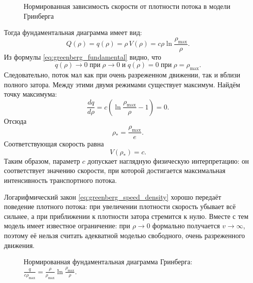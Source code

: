 \documentclass[12pt,a4paper]{article}
\begin{document}
\begin{figure}[ht]
\centering
{}
\caption{Нормированная зависимость скорости от плотности потока в модели Гринберга}
\label{fig:greenberg_speed_general}
\end{figure}
Тогда фундаментальная диаграмма имеет вид:
\begin{equation}
Q(\rho)=q(\rho)=\rho\,V(\rho)
=c\rho\ln\frac{\rho_{\max}}{\rho}.
\label{eq:greenberg_fundamental}
\end{equation}
Из формулы \eqref{eq:greenberg_fundamental} видно, что
\[
q(\rho)\to 0 \; \text{при} \; \rho\to 0
\;\text{и}\;
q(\rho)=0 \; \text{при} \; \rho=\rho_{\max}.
\]
Следовательно, поток мал как при очень разреженном движении, так и вблизи полного затора. Между этими двумя режимами существует максимум. Найдём точку максимума:
\[
\frac{dq}{d\rho}
=c\left(\ln\frac{\rho_{\max}}{\rho}-1\right)=0.
\]
Отсюда
\[
\rho_*=\frac{\rho_{\max}}{e}.
\]
Соответствующая скорость равна
\[
V(\rho_*)=c.
\]
Таким образом, параметр $c$ допускает наглядную физическую интерпретацию: он соответствует значению скорости, при которой достигается максимальная интенсивность транспортного потока.

Логарифмический закон \eqref{eq:greenberg_speed_density} хорошо передаёт поведение плотного потока: при увеличении плотности скорость убывает всё сильнее, а при приближении к плотности затора стремится к нулю. Вместе с тем модель имеет известное ограничение: при \(\rho\to 0\) формально получается \(v\to\infty\), поэтому её нельзя считать адекватной моделью свободного, очень разреженного движения.

\begin{figure}[ht]
\centering
{}

\captionsetup{justification=centering}
\caption{Нормированная фундаментальная диаграмма Гринберга:
\\
\(\displaystyle \frac{q}{c\rho_{\max}}=\frac{\rho}{\rho_{\max}}\ln\frac{\rho_{\max}}{\rho}\).}
\label{fig:greenberg_normalized}
\end{figure}
\end{document}
